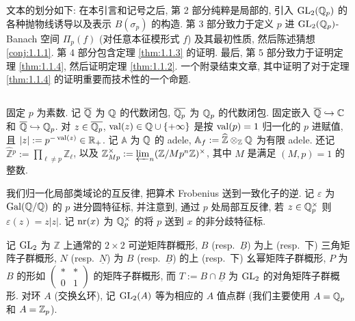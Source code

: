 文本的划分如下: 在本引言和记号之后, 第 2 部分纯粹是局部的, 引入 $\mathrm{GL}_2(\mathbb{Q}_p)$ 的各种抛物线诱导以及表示 $B(\sigma_p)$ 的构造.
第 3 部分致力于定义 $p$ 进 $\mathrm{GL}_2(\mathbb{Q}_p)$-Banach 空间 $\Pi_p(f)$ (对任意本征模形式 $f$) 及其最初性质, 然后陈述猜想 \ref{conj:1.1.1}.
第 4 部分包含定理 \ref{thm:1.1.3} 的证明.
最后, 第 5 部分致力于证明定理 \ref{thm:1.1.4}, 然后证明定理 \ref{thm:1.1.2}.
一个附录结束文章, 其中证明了对于定理 \ref{thm:1.1.4} 的证明重要而技术性的一个命题.

\subsection{\mbox{}}

固定 $p$ 为素数.
记 $\overline{\mathbb{Q}}$ 为 $\mathbb{Q}$ 的代数闭包, $\overline{\mathbb{Q}_p}$ 为 $\mathbb{Q}_p$ 的代数闭包.
固定嵌入 $\overline{\mathbb{Q}} \hookrightarrow \mathbb{C}$ 和 $\overline{\mathbb{Q}} \hookrightarrow \mathbb{Q}_p$.
对 $z \in \overline{\mathbb{Q}_p}$, $\operatorname{val}(z) \in \mathbb{Q} \cup \{+\infty\}$ 是按 $\operatorname{val}(p) = 1$ 归一化的 $p$ 进赋值, 且 $|z| := p^{-\operatorname{val}(z)} \in \mathbb{R}_{+}$.
记 $\mathbb{A}$ 为 $\mathbb{Q}$ 的 adele, $\mathbb{A}_f := \widehat{\mathbb{Z}} \otimes_{\mathbb{Z}} \mathbb{Q}$ 为有限 adele.
还记 $\widehat{\mathbb{Z}}{}^{p} := \prod_{\ell \neq p} \mathbb{Z}_{\ell}$, 以及 $\mathbb{Z}_{Mp}^{\times} := \varprojlim_n (\mathbb{Z}/Mp^{n}\mathbb{Z})^{\times}$, 其中 $M$ 是满足 $(M,p) = 1$ 的整数.

我们归一化局部类域论的互反律, 把算术 Frobenius 送到一致化子的逆.
记 $\varepsilon$ 为 $\operatorname{Gal}(\mathbb{Q}/\mathbb{Q})$ 的 $p$ 进分圆特征标, 并注意到, 通过 $p$ 处局部互反律, 若 $z \in \mathbb{Q}_p^{\times}$ 则 $\varepsilon(z) = z|z|$.
记 $\operatorname{nr}(x)$ 为 $\mathbb{Q}_p^{\times}$ 的将 $p$ 送到 $x$ 的非分歧特征标.

记 $\mathrm{GL}_2$ 为 $\mathbb{Z}$ 上通常的 $2 \times 2$ 可逆矩阵群概形, $B$ (resp.\ $\underline{B}$) 为上 (resp.\ 下) 三角矩阵子群概形, $N$ (resp.\ $\underline{N}$) 为 $B$ (resp.\ $\underline{B}$) 的上 (resp.\ 下) 幺幂矩阵子群概形, $P$ 为 $B$ 的形如 $\begin{pmatrix} * & * \\ 0 & 1 \end{pmatrix}$ 的矩阵子群概形, 而 $T := B \cap \underline{B}$ 为 $\mathrm{GL}_2$ 的对角矩阵子群概形.
对环 $A$ (交换幺环), 记 $\mathrm{GL}_2(A)$ 等为相应的 $A$ 值点群 (我们主要使用 $A = \mathbb{Q}_p$ 和 $A = \mathbb{Z}_p$).

